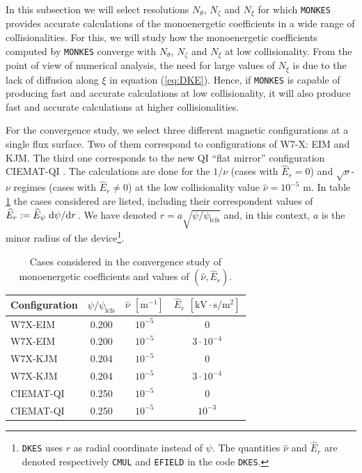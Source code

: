 \documentclass[10pt]{iopart}
\newcommand{\MONKES}{{\texttt{MONKES}}}
\newcommand{\DKES}{{\texttt{DKES}}}
\begin{document}
In this subsection we will select resolutions $N_\theta$, $N_\zeta$ and $N_\xi$ for which {\MONKES} provides accurate calculations of the monoenergetic coefficients in a wide range of collisionalities. For this, we will study how the monoenergetic coefficients computed by {\MONKES} converge with $N_\theta$, $N_\zeta$ and $N_\xi$ at low collisionality. From the point of view of numerical analysis, the need for large values of $N_\xi$ is due to the lack of diffusion along $\xi$ in equation (\ref{eq:DKE}). Hence, if {\MONKES} is capable of producing fast and accurate calculations at low collisionality, it will also produce fast and accurate calculations at higher collisionalities. 

For the convergence study, we select three different magnetic configurations at a single flux surface. Two of them correspond to configurations of W7-X: EIM and KJM. The third one corresponds to the new QI ``flat mirror'' \cite{velasco2023robust} configuration CIEMAT-QI \cite{Sanchez_2023}. The calculations are done for the $1/\nu$ (cases with $\widehat{E}_r=0$) and $\sqrt{\nu}$-$\nu$ regimes \cite{dherbemont2022} (cases with $\widehat{E}_r\ne 0$) at the low collisionality value $\hat{\nu}=10^{-5}$ m. In table \ref{tab:Convergence_cases} the cases considered are listed, including their correspondent values of $\widehat{E}_r:= \widehat{E}_\psi\dv*{\psi}{r}$. We have denoted $r = a \sqrt{\psi/\psi_{\text{lcfs}}}$ and, in this context, $a$ is the minor radius of the device\footnote{{\DKES} uses $r$ as radial coordinate instead of $\psi$. The quantities $\hat{\nu}$ and $\widehat{E}_r$ are denoted respectively \texttt{CMUL} and \texttt{EFIELD} in the code {\DKES}.}.
\begin{table}[h]
	\centering
	\begin{tabular}{@{}lccc@{}}
		\toprule
		Configuration & $\psi/\psi_{\text{lcfs}}$ & $\hat{\nu}$ $[\text{m}^{-1}]$ & $\widehat{E}_r$  $[\text{kV}\cdot\text{s}/\text{m}^2]$   \\ \midrule
		W7X-EIM       & 0.200                     & $10^{-5}$   & 0 \\
		W7X-EIM       & 0.200                     & $10^{-5}$   & $3\cdot10^{-4}$ \\
		W7X-KJM       & 0.204                     & $10^{-5}$   & 0 \\
		W7X-KJM       & 0.204                     & $10^{-5}$   & $3\cdot10^{-4}$ \\ 
		CIEMAT-QI     & 0.250                     & $10^{-5}$   & 0       \\
		CIEMAT-QI     & 0.250                     & $10^{-5}$   & $10^{-3}$       \\
		\bottomrule
	\end{tabular}
	\caption{Cases considered in the convergence study of monoenergetic coefficients and values of $(\hat{\nu},\widehat{E}_r)$.}
	\label{tab:Convergence_cases}
\end{table}
\end{document}
